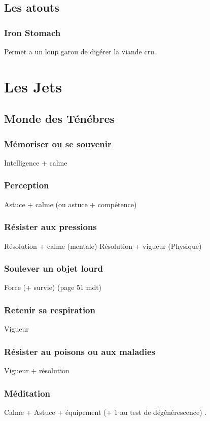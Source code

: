 \documentclass[oneside,12pt]{book}
\begin{document}
\begin{flushleft}
\section{Les atouts}       
\subsection{Iron Stomach}
Permet a un loup garou de digérer la viande cru. 









\chapter{Les Jets}


\section{Monde des Ténébres}
\subsection{Mémoriser ou se souvenir}
Intelligence + calme
\subsection{Perception}
Astuce + calme (ou astuce + compétence)
\subsection{Résister aux pressions}
Résolution + calme (mentale)
Résolution + vigueur (Physique)
\subsection{Soulever un objet lourd}
Force (+ survie) (page 51 mdt)
\subsection{Retenir sa respiration}
Vigueur
\subsection{Résister au poisons ou aux maladies}
Vigueur +  résolution
\subsection{Méditation}
Calme + Astuce + équipement (+ 1 au test de dégénérescence) .




\end{flushleft}
\end{document}
